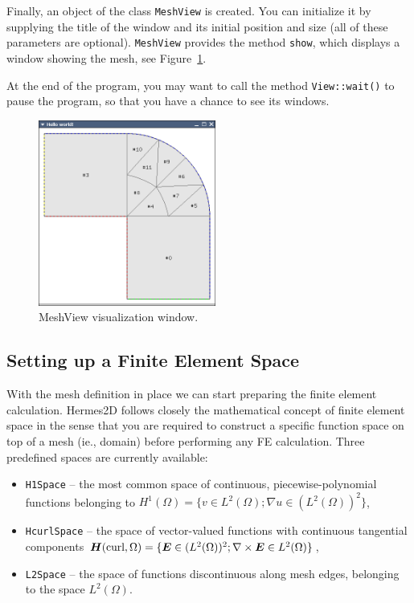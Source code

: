 Finally, an object of the class {\tt MeshView} is created. You can initialize it by
supplying the title of the window and its initial position and size (all of these
parameters are optional). {\tt MeshView} provides the method {\tt show}, which
displays a window showing the mesh, see Figure~\ref{fig:meshview}.

At the end of the program, you may want to call the method {\tt View::wait()} to pause
the program, so that you have a chance to see its windows.

\begin{figure}[h!]
  \centering\medskip
  \includegraphics[width=0.52\textwidth]{img/meshview.png}
  \caption{MeshView visualization window.}
  \label{fig:meshview}
\end{figure}



\subsection{Setting up a Finite Element Space}

With the mesh definition in place we can start preparing the finite element calculation.
Hermes2D follows closely the mathematical concept of finite element space in the
sense that you are required to construct a specific function space on top of a mesh
(ie., domain) before performing any FE calculation. Three predefined spaces are currently
available:
\begin{itemize}
  \item {\tt H1Space} --  the most common space of continuous,
        piecewise-polynomial functions belonging to $H^1(\Omega) = \{ v \in L^2(\Omega);
        \nabla u \in (L^2(\Omega))^2 \}$,
  \item {\tt HcurlSpace} --  the space of vector-valued functions with
        continuous tangential components $\mbox{\boldmath $H$}(\mbox{curl},\Omega) = \{ \mbox{\boldmath $E$} \in (L^2(\Omega))^2;
        \nabla \times \mbox{\boldmath $E$} \in L^2(\Omega)\}$,
  \item {\tt L2Space} --  the space of functions discontinuous along mesh edges,
        belonging to the space $L^2(\Omega)$.
\end{itemize}

